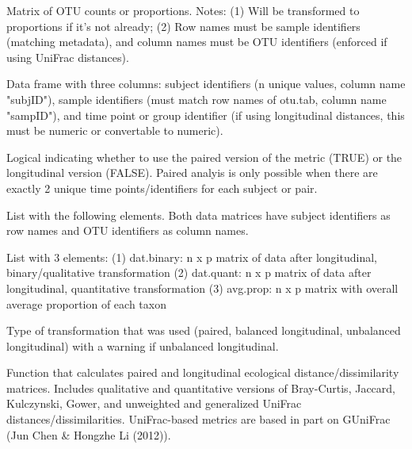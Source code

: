\documentclass[a4paper]{book}
\begin{document}
\begin{Arguments}
\begin{ldescription}
\item[\code{otus}] Matrix of OTU counts or proportions. Notes: (1) Will be transformed to 
proportions if it's not already; (2) Row names must be sample identifiers 
(matching metadata), and column names must be OTU identifiers (enforced if 
using UniFrac distances).

\item[\code{metadata}] Data frame with three columns: subject identifiers (n unique values, column name "subjID"), 
sample identifiers (must match row names of otu.tab, column name "sampID"), 
and time point or group identifier (if using longitudinal distances, this must be numeric or 
convertable to numeric).

\item[\code{paired}] Logical indicating whether to use the paired version of the metric (TRUE) or the 
longitudinal version (FALSE). Paired analyis is only possible when there are exactly 2 
unique time points/identifiers for each subject or pair.
\end{ldescription}
\end{Arguments}
%
\begin{Value}
List with the following elements. Both data matrices have subject identifiers 
as row names and OTU identifiers as column names.  
\begin{ldescription}
\item[\code{tsf.data}] List with 3 elements: 
(1) dat.binary: n x p matrix of data after longitudinal, binary/qualitative transformation 
(2) dat.quant: n x p matrix of data after longitudinal, quantitative transformation
(3) avg.prop: n x p matrix with overall average proportion of each taxon 
\item[\code{type}] Type of transformation that was used (paired, balanced longitudinal, 
unbalanced longitudinal) with a warning if unbalanced longitudinal.
\end{ldescription}
\end{Value}
%
\begin{Description}\relax
Function that calculates paired and longitudinal ecological distance/dissimilarity 
matrices. Includes qualitative and quantitative versions of Bray-Curtis, Jaccard, Kulczynski, 
Gower, and unweighted and generalized UniFrac distances/dissimilarities. UniFrac-based 
metrics are based in part on GUniFrac (Jun Chen \& Hongzhe Li (2012)).
\end{Description}
\end{document}
